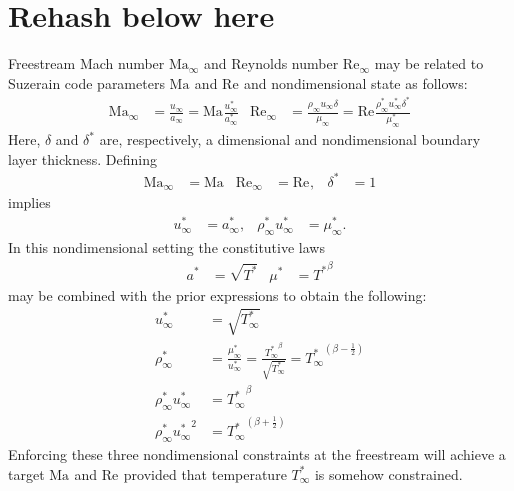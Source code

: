 \documentclass[letterpaper,11pt,nointlimits,reqno]{amsart}
\newcommand{\Mach}[1][]{\ensuremath{\mbox{Ma}_{#1}}}
\newcommand{\Reynolds}[1][]{\ensuremath{\mbox{Re}_{#1}}}
\begin{document}
\section{Rehash below here}



Freestream Mach number $\Mach[\infty]$ and Reynolds number $\Reynolds[\infty]$
may be related to Suzerain code parameters $\Mach$ and $\Reynolds$ and
nondimensional state as follows:
\begin{align}
  \Mach[\infty]{}
  &=         \frac{u_\infty     }{a_\infty     }
   = \Mach{} \frac{u_\infty^\ast}{a_\infty^\ast}
&
  \Reynolds[\infty]{}
  &=             \frac{\rho_\infty      u_\infty      \delta     }
                      {\mu_\infty     }
   = \Reynolds{} \frac{\rho_\infty^\ast u_\infty^\ast \delta^\ast}
                      {\mu_\infty^\ast}
\end{align}
Here, $\delta$ and $\delta^\ast$ are, respectively, a dimensional and
nondimensional boundary layer thickness.
Defining
\begin{align}
  \Mach[\infty]{} &= \Mach
& \Reynolds[\infty]{} &= \Reynolds,
& \delta^\ast &= 1
\end{align}
implies
\begin{align}
  u_\infty^\ast   &= a_\infty^\ast,
&
  \rho_\infty^\ast u_\infty^\ast &= \mu_\infty^\ast
.
\end{align}
In this nondimensional setting the constitutive laws
\begin{align}
  a^\ast &= \sqrt{T^\ast}
&\mu^\ast &= {T^\ast}^\beta
\end{align}
may be combined with the prior expressions to obtain the following:
\begin{align}
  \label{eq:u_target}
  u_\infty^\ast &= \sqrt{T_\infty^\ast}
\\
  \label{eq:rho_target}
  \rho_\infty^\ast &= \frac{\mu_\infty^\ast}{u_\infty^\ast}
                    = \frac{{T_\infty^\ast}^\beta}{\sqrt{T_\infty^\ast}}
                    = {T_\infty^\ast}^{\left(\beta-\frac{1}{2}\right)}
\\
  \label{eq:mx_target}
  \rho_\infty^\ast u_\infty^\ast &= {T_\infty^\ast}^\beta
\\
  \label{eq:ke_target}
  \rho_\infty^\ast {u_\infty^\ast}^2
&=
  {T_\infty^\ast}^{\left(\beta + \frac{1}{2}\right)}
\end{align}
Enforcing these three nondimensional constraints at the freestream will achieve
a target $\Mach$ and $\Reynolds$ provided that temperature $T_\infty^\ast$ is
somehow constrained.
\end{document}
